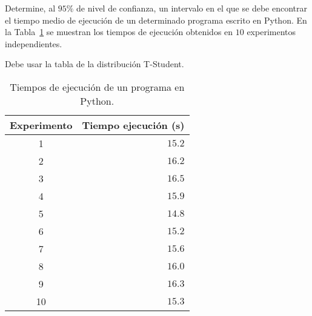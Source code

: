 \begin{ejercicio}\label{ej:4.19}
Determine, al $95\%$ de nivel de confianza, un intervalo en el que se debe encontrar el tiempo medio de ejecución de un determinado programa escrito en Python. En la Tabla~\ref{tab:ej:4.19} se muestran los tiempos de ejecución obtenidos en $10$ experimentos independientes.
\begin{observacion}
    Debe usar la tabla de la distribución T-Student.
\end{observacion}
\begin{table}[h]
\centering
\begin{tabular}{@{}cr@{}}
\toprule
Experimento & Tiempo ejecución (s) \\ \midrule
1 & $15.2$ \\
2 & $16.2$ \\
3 & $16.5$ \\
4 & $15.9$ \\
5 & $14.8$ \\
6 & $15.2$ \\
7 & $15.6$ \\
8 & $16.0$ \\
9 & $16.3$ \\
10 & $15.3$ \\ \bottomrule
\end{tabular}
\caption{Tiempos de ejecución de un programa en Python.}
\label{tab:ej:4.19}
\end{table}
\end{ejercicio}
\begin{comment}Sol:
El intervalo de confianza al $95\%$ para el tiempo medio de ejecución del programa en Python es $[15.3, 16.1]$ segundos.
\end{comment}